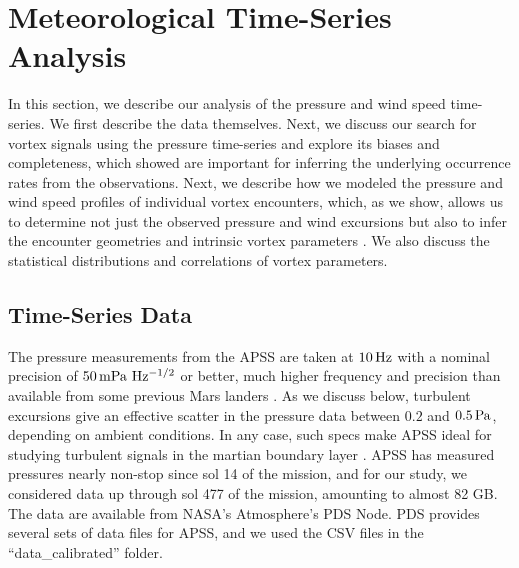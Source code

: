 \documentclass[linenumbers,trackchanges]{aastex63}
\begin{document}
\section{Meteorological Time-Series Analysis}
\label{sec:Meteorological Time-Series Analysis}
In this section, we describe our analysis of the pressure and wind speed time-series. We first describe the data themselves. Next, we discuss our search for vortex signals using the pressure time-series and explore its biases and completeness, which \citet{2015JGRE..120..401J} showed are important for inferring the underlying occurrence rates from the observations. Next, we describe how we modeled the pressure and wind speed profiles of individual vortex encounters, which, as we show, allows us to determine not just the observed pressure and wind excursions but also to infer the encounter geometries and intrinsic vortex parameters \citep[\emph{cf.}][]{2016Icar..271..326L}. We also discuss the statistical distributions and correlations of vortex parameters. 

\subsection{Time-Series Data}
\label{sec:Time-Series Data}
The pressure measurements from the APSS are taken at $10\, {\rm Hz}$ with a nominal precision of $50\,{\rm mPa\ Hz^{-1/2}}$ or better, much higher frequency and precision than available from some previous Mars landers \citep[\emph{e.g.},][]{2010JGRE..115.0E16E}. As we discuss below, turbulent excursions give an effective scatter in the pressure data between $0.2$ and $0.5\,{\rm Pa}$, depending on ambient conditions. In any case, such specs make APSS ideal for studying turbulent signals in the martian boundary layer \citep{2018SSRv..214..109S}. APSS has measured pressures nearly non-stop since sol 14 of the mission, and for our study, we considered data up through sol 477 of the mission, amounting to almost 82 GB. The data are available from NASA's Atmosphere's PDS Node. PDS provides several sets of data files for APSS, and we used the CSV files in the ``data\_calibrated'' folder. 
\end{document}
